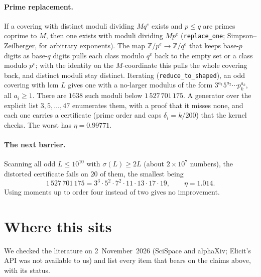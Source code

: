 \documentclass[11pt]{article}
\theoremstyle{definition}
\theoremstyle{remark}
\newcommand{\Z}{\mathbb{Z}}
\newcommand{\lean}[1]{\texttt{#1}}
\begin{document}
\paragraph{Prime replacement.} If a covering with distinct moduli dividing $M q^e$ exists and $p \le q$ are primes coprime to $M$, then one exists with moduli dividing $M p^e$ (\lean{replace\_one}; Simpson--Zeilberger, for arbitrary exponents). The map $\Z/p^e \to \Z/q^e$ that keeps base-$p$ digits as base-$q$ digits pulls each class modulo $q^v$ back to the empty set or a class modulo $p^v$; with the identity on the $M$-coordinate this pulls the whole covering back, and distinct moduli stay distinct. Iterating (\lean{reduce\_to\_shaped}), an odd covering with lcm $L$ gives one with a no-larger modulus of the form $3^{a_1}5^{a_2}\cdots p_k^{a_k}$, all $a_i \ge 1$. There are $1638$ such moduli below $1\,527\,701\,175$. A generator over the explicit list $3, 5, \dots, 47$ enumerates them, with a proof that it misses none, and each one carries a certificate (prime order and caps $\delta_i = k/200$) that the kernel checks. The worst has $\eta = 0.99771$.

\paragraph{The next barrier.} Scanning all odd $L \le 10^{10}$ with $\sigma(L) \ge 2L$ (about $2\times10^7$ numbers), the distorted certificate fails on $20$ of them, the smallest being
\[
1\,527\,701\,175 = 3^3\cdot5^2\cdot7^2\cdot11\cdot13\cdot17\cdot19, \qquad \eta = 1.014 .
\]
Using moments up to order four instead of two gives no improvement.

\section{Where this sits}\label{sec:context}

We checked the literature on 2~November~2026 (SciSpace and alphaXiv; Elicit's API was not available to us) and list every item that bears on the claims above, with its status.
\end{document}
